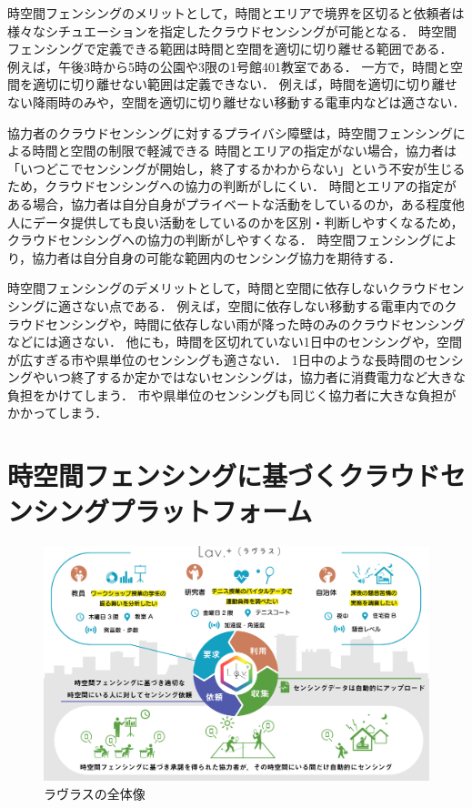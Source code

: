 時空間フェンシングのメリットとして，時間とエリアで境界を区切ると依頼者は様々なシチュエーションを指定したクラウドセンシングが可能となる．
時空間フェンシングで定義できる範囲は時間と空間を適切に切り離せる範囲である．
例えば，午後3時から5時の公園や3限の1号館401教室である．
一方で，時間と空間を適切に切り離せない範囲は定義できない．
例えば，時間を適切に切り離せない降雨時のみや，空間を適切に切り離せない移動する電車内などは適さない．

協力者のクラウドセンシングに対するプライバシ障壁は，時空間フェンシングによる時間と空間の制限で軽減できる
時間とエリアの指定がない場合，協力者は「いつどこでセンシングが開始し，終了するかわからない」という不安が生じるため，クラウドセンシングへの協力の判断がしにくい．
時間とエリアの指定がある場合，協力者は自分自身がプライベートな活動をしているのか，ある程度他人にデータ提供しても良い活動をしているのかを区別・判断しやすくなるため，クラウドセンシングへの協力の判断がしやすくなる．
時空間フェンシングにより，協力者は自分自身の可能な範囲内のセンシング協力を期待する．

時空間フェンシングのデメリットとして，時間と空間に依存しないクラウドセンシングに適さない点である．
例えば，空間に依存しない移動する電車内でのクラウドセンシングや，時間に依存しない雨が降った時のみのクラウドセンシングなどには適さない．
他にも，時間を区切れていない1日中のセンシングや，空間が広すぎる市や県単位のセンシングも適さない．
1日中のような長時間のセンシングやいつ終了するか定かではないセンシングは，協力者に消費電力など大きな負担をかけてしまう．
市や県単位のセンシングも同じく協力者に大きな負担がかかってしまう．

\section{時空間フェンシングに基づくクラウドセンシングプラットフォーム}

\begin{figure}[tbh]
    \centering
    \includegraphics[width=16cm]{img_lavlus.png}
    \caption{ラヴラスの全体像}
    \label{fig:lavlus}
\end{figure}

